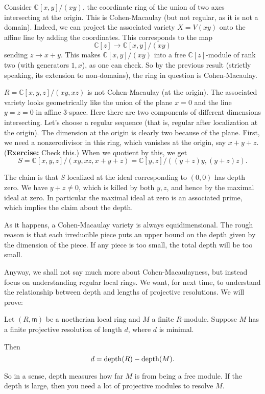 \begin{example}
Consider $\mathbb{C}[x,y]/(xy)$, the coordinate ring of the
union of two axes
intersecting at the origin. This is Cohen-Macaulay (but not
regular, as it
is not a domain). Indeed, we can project the associated variety
$X = V(xy)$
onto the affine line by adding the coordinates. This corresponds
to the map
\[ \mathbb{C}[z] \to \mathbb{C}[x,y]/(xy)  \]
sending $z \to x+y$. This makes $\mathbb{C}[x,y]/(xy)$ into a
free
$\mathbb{C}[z]$-module of rank two (with generators $1, x$), as
one can check.
So by the previous result (strictly speaking, its extension to
non-domains),
the ring in question is Cohen-Macaulay.
\end{example}

\begin{example}
$R=\mathbb{C}[x,y,z]/(xy, xz)$ is not Cohen-Macaulay (at the
origin). The associated variety looks
geometrically like the union of the plane $x=0$ and the line
$y=z=0$ in affine
3-space. Here there are two components of different dimensions
intersecting.
Let's choose a regular sequence (that is, regular after
localization at the
origin). The dimension at the origin is clearly two because of
the plane.
First, we need a nonzerodivisor in this ring, which vanishes at
the origin, say
$ x+y+z$. (\textbf{Exercise:} Check this.) When we quotient by
this, we get
\[ S=\mathbb{C}[x,y,z]/(xy,xz, x+y+z) = \mathbb{C}[y,z]/(
(y+z)y, (y+z)z). \]

The claim is that $S$ localized at the ideal corresponding to
$(0,0)$ has depth
zero. We have $y+z \neq 0$, which is killed by both $y,z$, and
hence by the
maximal ideal at zero. In particular the maximal ideal at zero
is an associated
prime, which implies the claim about the depth.
\end{example}

As it happens, a Cohen-Macaulay variety is always
equidimensional. The rough
reason is that each irreducible piece puts an upper bound on the
depth given by
the dimension of the piece. If any piece is too small, the total
depth will be
too small.

Anyway, we shall not say much more about Cohen-Macaulayness, but
instead focus
on understanding regular local rings. We want, for next time,
to understand the relationship
between depth and lengths of projective resolutions.
We will prove:

\begin{theorem} Let $(R,
\mathfrak{m})$ be a
noetherian local ring and $M$ a finite $R$-module. Suppose $M$
has a finite
projective resolution of length $d$, where $d$ is minimal.

Then
\[ d = \operatorname{depth}(R) - \operatorname{depth}(M).  \]
\end{theorem}
So in a sense, depth measures how far $M$ is from being a free
module. If the
depth is large, then you need a lot of projective modules to
resolve $M$.

